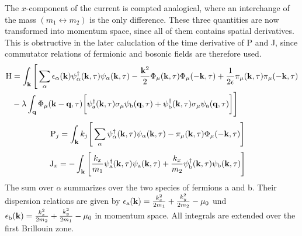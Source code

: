 %
The $x$-component of the current is compted analogical, where an interchange of the mass $(m_1 \leftrightarrow m_2)$ is the only difference. 
These three quantities are now transformed into momentum space, since all of them contains spatial derivatives.
This is obstructive in the later caluclation of the time derivative of P and J, since commutator relations of fermionic and bosonic fields are therefore used.
%
\begin{align}
	\mathrm{H} &= 
	 	\int_{\vb{k}}
	 	\Bigg[ \sum\limits_{\alpha} \epsilon_{\alpha}(\vb{k}) \psi_{\alpha}^{\dag}(\vb{k},\tau) \psi_{\alpha}(\vb{k},\tau)
		-
		\frac{\vb{k}^{2}}{2} \Phi_{\mu}(\vb{k},\tau) \Phi_{\mu}(-\vb{k},\tau)
		+
		\frac{1}{2\epsilon} \pi_{\mu}(\vb{k},\tau) \pi_{\mu}(-\vb{k},\tau)
		\notag \\ &
		-
		\lambda \int_{\vb{q}} \Phi_{\mu}(\vb{k}-\vb{q},\tau)
		\bigg[
			\psi_{\mathrm{a}}^{\dag}(\vb{k},\tau) \sigma_{\mu} \psi_{\mathrm{b}}(\vb{q},\tau)
			+
			\psi_{\mathrm{b}}^{\dag}(\vb{k},\tau) \sigma_{\mu} \psi_{\mathrm{a}}(\vb{q},\tau)
		\bigg]
		\Bigg]
\end{align}
%
%
\begin{align}
	\mathrm{P}_{j} &= \int_{\vb{k}}
		k_{j} \Bigg[ \sum\limits_{\alpha} \psi_{\alpha}^{\dag}(\vb{k},\tau) \psi_{\alpha}(\vb{k},\tau)
	 	-
	 	\pi_{\mu}(\vb{k},\tau)
	 	\Phi_{\mu}(-\vb{k},\tau)
	\Bigg]
\end{align}
%
%
\begin{align}
	\mathrm{J}_{x} &= - \int_{\vb{k}} \Bigg[
		\frac{k_{x}}{m_{1}}
		\psi_{\mathrm{a}}^{\dag}(\vb{k},\tau)
		\psi_{\mathrm{a}}(\vb{k},\tau)
		+
		\frac{k_{x}}{m_{2}}
		\psi_{\mathrm{b}}^{\dag}(\vb{k},\tau)
		\psi_{\mathrm{b}}(\vb{k},\tau)
	\Bigg]
\end{align}
%
The sum over $\alpha$ summarizes over the two species of fermions a and b.
Their dispersion relations are given by $\epsilon_{\mathrm{a}}(\vb{k}) = \frac{k_{x}^{2}}{2m_{1}} + \frac{k_{y}^{2}}{2m_{2}} - \mu_{0}$ und $\epsilon_{\mathrm{b}}(\vb{k}) = \frac{k_{x}^{2}}{2m_{2}} + \frac{k_{y}^{2}}{2m_{1}} - \mu_{0}$ in momentum space.
All integrals are extended over the first Brillouin zone.

